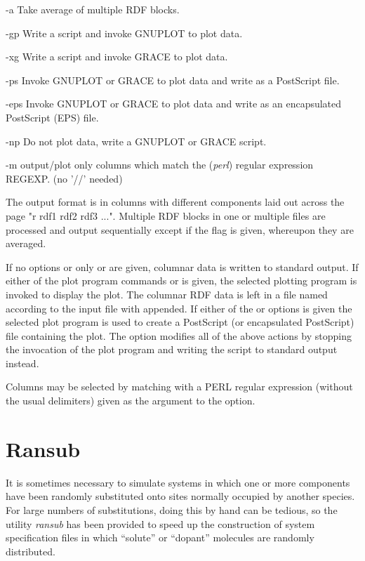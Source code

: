 \documentclass[a4paper,twoside]{report}
\begin{document}
\begin{Argdescription}  
      \item[-a]         Take average of multiple RDF blocks.
      \item[-gp]        Write a script and invoke GNUPLOT to plot data.
      \item[-xg]        Write a script and invoke GRACE to plot data.
      \item[-ps]        Invoke GNUPLOT or GRACE to plot data and write as a PostScript file.
      \item[-eps]       Invoke GNUPLOT or GRACE to plot data and write as an encapsulated PostScript (EPS) file.
      \item[-np]        Do not plot data, write a GNUPLOT or GRACE script.
      \item[-m]  output/plot only columns which match the (\emph{perl}) regular expression REGEXP. (no '//' needed)    
\end{Argdescription}

The output format is in columns with different components laid out
across the page "r rdf1 rdf2 rdf3 ...".  Multiple RDF blocks in one or
multiple files are processed and output sequentially except if the 
flag is given, whereupon they are averaged.

If no options or only  or  are given, columnar data is
written to standard output.  If either of the plot program commands
 or  is given, the selected plotting program is
invoked to display the plot. The columnar RDF data  is left in a file
named according to the input file with  appended.
If either of the  or  options is given the selected
plot program is used to create a PostScript (or encapsulated
PostScript) file containing the plot.  The  option modifies
all of the above actions by stopping the invocation of the plot
program and writing the script to standard output instead.

Columns may be selected by matching with a PERL regular expression
(without the usual delimiters) given as the argument to the 
option.

\section{Ransub}%
\label{sec:ransub}
It is sometimes necessary to simulate systems in which one or
more components have been randomly substituted onto sites
normally occupied by another species. For large numbers of substitutions,
doing this by hand can be tedious, so the utility \emph{ransub} has been
provided to speed up the construction of system specification files in which
``solute'' or ``dopant'' molecules are randomly distributed.
        
\end{document}
